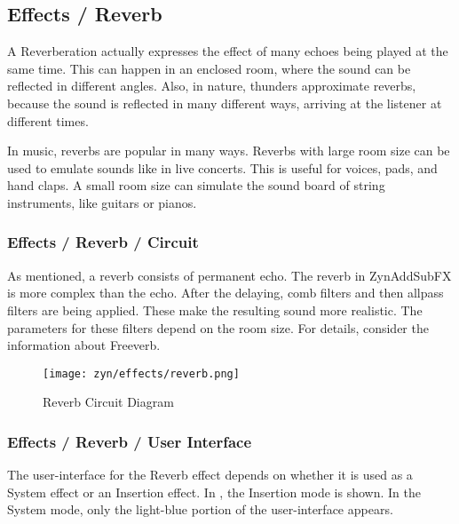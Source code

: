 

\subsection{Effects / Reverb}
\label{subsec:effects_edit_reverb}

   A Reverberation actually expresses the effect of many echoes being played
   at the same time. This can happen in an enclosed room, where the sound can
   be reflected in different angles. Also, in nature, thunders approximate
   reverbs, because the sound is reflected in many different ways, arriving
   at the listener at different times.

   In music, reverbs are popular in many ways. Reverbs with large room size
   can be used to emulate sounds like in live concerts. This is useful for
   voices, pads, and hand claps. A small room size can simulate the sound
   board of string instruments, like guitars or pianos.

\subsubsection{Effects / Reverb / Circuit}
\label{subsubsec:effects_edit_reverb_circuit}

   As mentioned, a reverb consists of permanent echo. The reverb in
   ZynAddSubFX is more complex than the echo. After the delaying, comb
   filters and then allpass filters are being applied. These make the
   resulting sound more realistic. The parameters for these filters depend on
   the room size. For details, consider the information about Freeverb.

\begin{figure}[H]
   \centering
   \texttt{[image: zyn/effects/reverb.png]}
   \caption{Reverb Circuit Diagram}
   \label{fig:reverb_circuit_diagram}
\end{figure}

\subsubsection{Effects / Reverb / User Interface}
\label{subsubsec:effects_edit_reverb_ui}

   The user-interface for the Reverb effect depends on whether it is used as a
   System effect or an Insertion effect.
   In ,
   the Insertion mode is shown.  In the System mode, only the light-blue
   portion of the user-interface appears.

